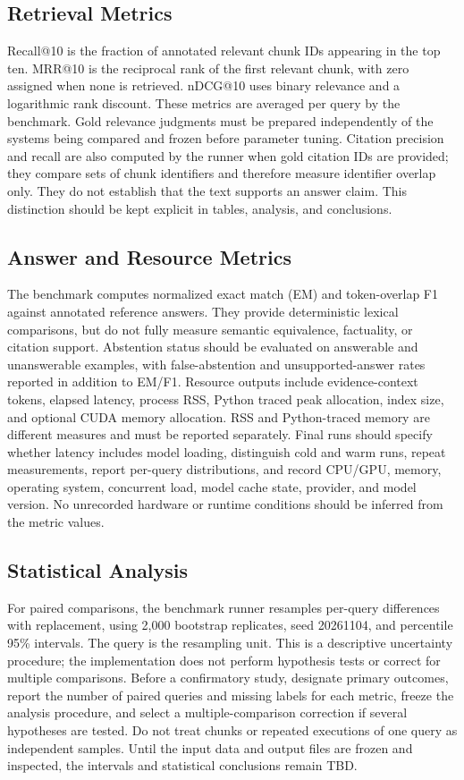 \documentclass[conference]{IEEEtran}
\begin{document}
\subsection{Retrieval Metrics}
Recall@10 is the fraction of annotated relevant chunk IDs appearing in the
top ten. MRR@10 is the reciprocal rank of the first relevant chunk, with zero
assigned when none is retrieved. nDCG@10 uses binary relevance and a
logarithmic rank discount. These metrics are averaged per query by the
benchmark. Gold relevance judgments must be prepared independently of the
systems being compared and frozen before parameter tuning. Citation precision
and recall are also computed by the runner when gold citation IDs are
provided; they compare sets of chunk identifiers and therefore measure
identifier overlap only. They do not establish that the text supports an
answer claim. This distinction should be kept explicit in tables, analysis,
and conclusions.

\subsection{Answer and Resource Metrics}
The benchmark computes normalized exact match (EM) and token-overlap F1
against annotated reference answers. They provide deterministic lexical
comparisons, but do not fully measure semantic equivalence, factuality, or
citation support. Abstention status should be evaluated on answerable and
unanswerable examples, with false-abstention and unsupported-answer rates
reported in addition to EM/F1. Resource outputs include evidence-context
tokens, elapsed latency, process RSS, Python traced peak allocation, index
size, and optional CUDA memory allocation. RSS and Python-traced memory are
different measures and must be reported separately. Final runs should specify
whether latency includes model loading, distinguish cold and warm runs,
repeat measurements, report per-query distributions, and record CPU/GPU,
memory, operating system, concurrent load, model cache state, provider, and
model version. No unrecorded hardware or runtime conditions should be inferred
from the metric values.

\subsection{Statistical Analysis}
For paired comparisons, the benchmark runner resamples per-query differences
with replacement, using 2,000 bootstrap replicates, seed 20261104, and
percentile 95\% intervals. The query is the resampling unit. This is a
descriptive uncertainty procedure; the implementation does not perform
hypothesis tests or correct for multiple comparisons. Before a confirmatory
study, designate primary outcomes, report the number of paired queries and
missing labels for each metric, freeze the analysis procedure, and select a
multiple-comparison correction if several hypotheses are tested. Do not treat
chunks or repeated executions of one query as independent samples. Until the
input data and output files are frozen and inspected, the intervals and
statistical conclusions remain TBD.
\end{document}
